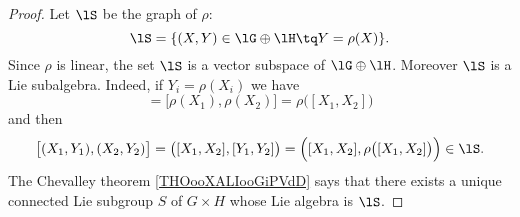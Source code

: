 \begin{proof}
	Let \( \lS\) be the graph of \( \rho\):
	\begin{equation}
		\lS=\{ (X,Y)\in \lG\oplus\lH\tq Y=\rho(X) \}.
	\end{equation}
	Since \( \rho\) is linear, the set \( \lS\) is a vector subspace of \( \lG \oplus\lH\). Moreover \( \lS\) is a Lie subalgebra. Indeed, if \( Y_i=\rho(X_i)\) we have
	\begin{equation}
		[Y_1,Y_2]=\big[ \rho(X_1),\rho(X_2) \big]=\rho\big( [X_1,X_2] \big)
	\end{equation}
	and then
	\begin{equation}
		\big[ (X_1,Y_1),(X_2,Y_2) \big]=\big( [X_1,X_2],[Y_1,Y_2] \big)=\Big( [X_1,X_2],\rho\big( [X_1,X_2] \big) \Big)\in\lS.
	\end{equation}
	The Chevalley theorem \ref{THOooXALIooGiPVdD} says that there exists a unique connected Lie subgroup \( S\) of \( G\times H\) whose Lie algebra is \( \lS\).


\end{proof}
